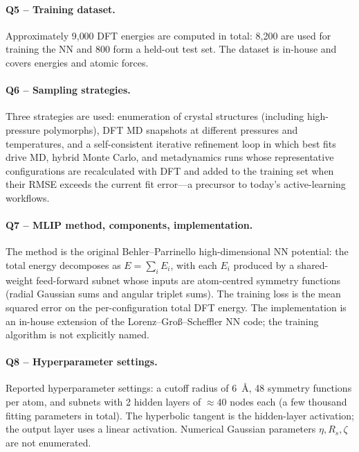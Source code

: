 \paragraph{Q5 -- Training dataset.}
Approximately 9{,}000 DFT energies are computed in total: 8{,}200
are used for training the NN and 800 form a held-out test set.
The dataset is in-house and covers energies and atomic forces.


\paragraph{Q6 -- Sampling strategies.}
Three strategies are used: enumeration of crystal structures
(including high-pressure polymorphs), DFT MD snapshots at
different pressures and temperatures, and a self-consistent
iterative refinement loop in which best fits drive MD,
hybrid Monte Carlo, and metadynamics runs whose representative
configurations are recalculated with DFT and added to the
training set when their RMSE exceeds the current fit error---a
precursor to today's active-learning workflows.


\paragraph{Q7 -- MLIP method, components, implementation.}
The method is the original Behler--Parrinello high-dimensional
NN potential: the total energy decomposes as
$E = \sum_i E_i$, with each $E_i$ produced by a shared-weight
feed-forward subnet whose inputs are atom-centred symmetry
functions (radial Gaussian sums and angular triplet sums). The
training loss is the mean squared error on the per-configuration
total DFT energy. The implementation is an in-house extension of
the Lorenz--Gro\ss{}--Scheffler NN code; the training algorithm
is not explicitly named.


\paragraph{Q8 -- Hyperparameter settings.}
Reported hyperparameter settings: a cutoff radius of 6~\AA{},
48 symmetry functions per atom, and subnets with 2 hidden layers
of $\approx 40$ nodes each (a few thousand fitting parameters in
total). The hyperbolic tangent is the hidden-layer activation;
the output layer uses a linear activation. Numerical Gaussian
parameters $\eta, R_s, \zeta$ are not enumerated.


